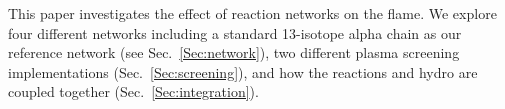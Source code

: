 \documentclass[preprint,times,tighten]{aastex631}
\begin{document}


This paper investigates the effect of reaction networks on the flame.  We explore four different networks including a standard 13-isotope alpha chain as our reference network (see Sec.\ \ref{Sec:network}), two
different plasma screening implementations (Sec.\ \ref{Sec:screening}), and how the reactions and hydro are coupled
together (Sec.\ \ref{Sec:integration}).
\end{document}
